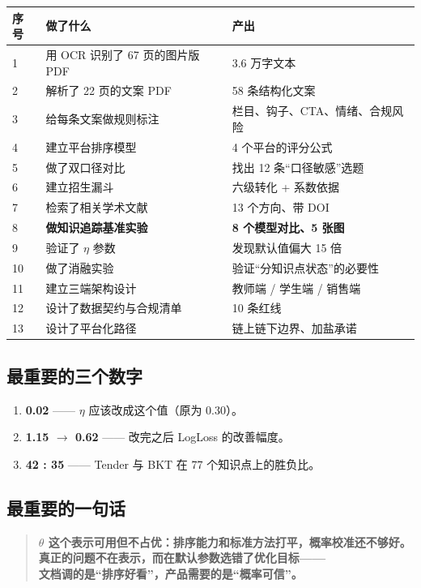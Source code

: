 \documentclass[UTF8,a4paper,11pt]{ctexart}
\begin{document}
\begin{longtable}{@{}p{1.0cm}p{6.0cm}p{6.6cm}@{}}
\toprule
\textbf{序号} & \textbf{做了什么} & \textbf{产出} \\
\midrule
1 & 用 OCR 识别了 67 页的图片版 PDF & 3.6 万字文本 \\
2 & 解析了 22 页的文案 PDF & 58 条结构化文案 \\
3 & 给每条文案做规则标注 & 栏目、钩子、CTA、情绪、合规风险 \\
4 & 建立平台排序模型 & 4 个平台的评分公式 \\
5 & 做了双口径对比 & 找出 12 条“口径敏感”选题 \\
6 & 建立招生漏斗 & 六级转化 + 系数依据 \\
7 & 检索了相关学术文献 & 13 个方向、带 DOI \\
8 & \textbf{做知识追踪基准实验} & \textbf{8 个模型对比、5 张图} \\
9 & 验证了 $\eta$ 参数 & 发现默认值偏大 15 倍 \\
10 & 做了消融实验 & 验证“分知识点状态”的必要性 \\
11 & 建立三端架构设计 & 教师端 / 学生端 / 销售端 \\
12 & 设计了数据契约与合规清单 & 10 条红线 \\
13 & 设计了平台化路径 & 链上链下边界、加盐承诺 \\
\bottomrule
\end{longtable}

\subsection{最重要的三个数字}

\begin{enumerate}[leftmargin=1.8em]
\item \textbf{0.02} —— $\eta$ 应该改成这个值（原为 0.30）。
\item \textbf{1.15 $\to$ 0.62} —— 改完之后 LogLoss 的改善幅度。
\item \textbf{42 : 35} —— Tender 与 BKT 在 77 个知识点上的胜负比。
\end{enumerate}

\subsection{最重要的一句话}

\begin{quote}
\large
\textbf{$\theta$ 这个表示可用但不占优：排序能力和标准方法打平，概率校准还不够好。\\
真正的问题不在表示，而在默认参数选错了优化目标——\\
文档调的是“排序好看”，产品需要的是“概率可信”。}
\end{quote}
\end{document}
